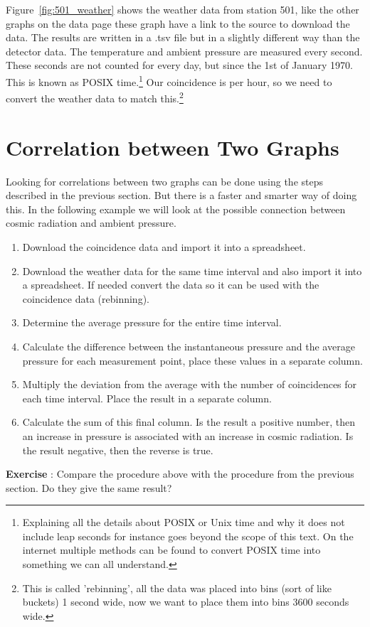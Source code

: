 Figure~\ref{fig:501_weather} shows the weather data from station 501, like the other graphs on the data page these graph have a link to the source to download the data. The results are written in a .tsv file but in a slightly different way than the detector data. The temperature and ambient pressure are measured every second. These seconds are not counted for every day, but since the 1st of January 1970. This is known as POSIX time.\footnote{Explaining all the details about POSIX or Unix time and why it does not include leap seconds for instance goes beyond the scope of this text. On the internet multiple methods can be found to convert POSIX time into something we can all understand.} Our coincidence is per hour, so we need to convert the weather data to match this.\footnote{This is called 'rebinning', all the data was placed into bins (sort of like buckets) 1 second wide, now we want to place them into bins 3600 seconds wide.}

\section{Correlation between Two Graphs}
Looking for correlations between two graphs can be done using the steps described in the previous section. But there is a faster and smarter way of doing this. In the following example we will look at the possible connection between cosmic radiation and ambient pressure.

\begin{enumerate}[1]
\item Download the coincidence data and import it into a spreadsheet.
\item Download the weather data for the same time interval and also import it into a spreadsheet. If needed convert the data so it can be used with the coincidence data (rebinning).
\item Determine the average pressure for the entire time interval.
\item Calculate the difference between the instantaneous pressure and the average pressure for each measurement point, place these values in a separate column.
\item Multiply the deviation from the average with the number of coincidences for each time interval. Place the result in a separate column.
\item Calculate the sum of this final column. Is the result a positive number, then an increase in pressure is associated with an increase in cosmic radiation. Is the result negative, then the reverse is true.
\end{enumerate}

\begin{shaded}
\textbf{Exercise \theExercise {}} : Compare the procedure above with the procedure from the previous section. Do they give the same result?\end{shaded}



